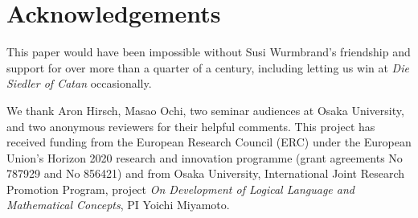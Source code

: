 \documentclass[output=paper,colorlinks,citecolor=brown,
]{langscibook}
\begin{document}
\section*{Acknowledgements}

This paper would have been impossible without Susi Wurmbrand's friendship and support for over more than a quarter of a century, including letting us win at \emph{Die Siedler of Catan} occasionally.

We thank Aron Hirsch, Masao Ochi, two seminar audiences at Osaka University, and two anonymous reviewers for their helpful comments.  This project has received funding from the European Research Council (ERC) under the European Union's Horizon 2020 research and innovation programme (grant agreements No 787929 and No 856421) and from Osaka University, International Joint Research Promotion Program, project \emph{On Development of Logical Language and Mathematical Concepts}, PI Yoichi Miyamoto.

\printbibliography[heading=subbibliography,notkeyword=this]
\end{document}
